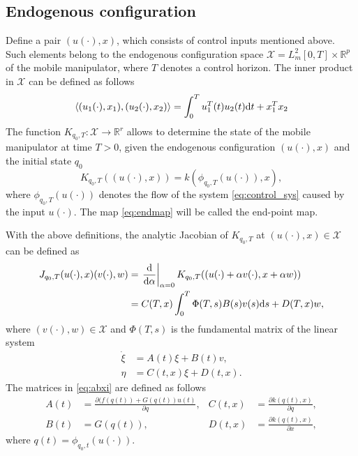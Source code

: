 \subsection{Endogenous configuration}
Define a pair $(u(\cdot), x)$, which consists of control inputs mentioned above.
Such elements belong to the endogenous configuration space
$\mathcal{X} = L_m^2[0, T] \times \mathbb{R}^p$ of the mobile manipulator, where $T$ denotes a
control horizon.
The inner product in $\mathcal{X}$ can be defined as follows \cite{ecs_ijc}
\begin{equation}
\langle (u_1(\cdot), x_1), (u_2(\cdot), x_2) \rangle = \int_0^T u_1^T(t) u_2(t) \mathrm{d} t + x_1^T x_2
\end{equation}
The function
$K_{q_0, T}: \mathcal{X} \rightarrow \mathbb{R}^r$
allows to determine the state of the mobile manipulator at time $T>0$, given
the endogenous configuration $(u(\cdot), x)$ and the initial state $q_0$
\begin{equation}
\label{eq:endmap}
K_{q_0, T}((u(\cdot), x)) = k(\phi_{q_0, T}(u(\cdot)), x),
\end{equation}
where $\phi_{q_0, T}(u(\cdot))$ denotes the flow of the system \eqref{eq:control_sys}
caused by the input $u(\cdot)$. The map \eqref{eq:endmap} will be called the end-point map.

With the above definitions, the analytic Jacobian of $K_{q_0, T}$ at $(u(\cdot), x) \in \mathcal{X}$ can be defined as \cite{ratajczak2013multiple}
\begin{align}
\label{eq:jacobian}
J_{q_0, T}(u(\cdot), x)(v(\cdot), w) &= \left.\frac{\mathrm{d}}{\mathrm{d} \alpha}\right|_{\alpha=0} K_{q_0, T}((u(\cdot)+\alpha v(\cdot), x+\alpha w))\\
 &= 
 C(T,x)\int_0^T \Phi(T,s)B(s)v(s)\mathrm{d} s + D(T,x)w,
\end{align}
where $(v(\cdot), w)\in \mathcal{X}$ and $\Phi(T,s)$ is the fundamental matrix of the linear system \cite{tchon2004acceleration}
\begin{equation}
\begin{aligned}
\label{eq:abxi}
\dot \xi &= A(t)\xi + B(t) v, \\
\eta &= C(t, x)\xi + D(t, x).
\end{aligned}
\end{equation}
The matrices in \eqref{eq:abxi} are defined as follows
\begin{equation}
\label{eq:matrices}
\begin{aligned}
A(t) &= \frac{\partial (f(q(t))+G(q(t))u(t)}{\partial q}, & C(t, x) &= \frac{\partial k(q(t), x)}{\partial q},\\
B(t) &= G(q(t)), & D(t, x) &= \frac{\partial k(q(t), x)}{\partial x},
\end{aligned}
\end{equation}
where $q(t)=\phi_{q_0, t}(u(\cdot))$.
